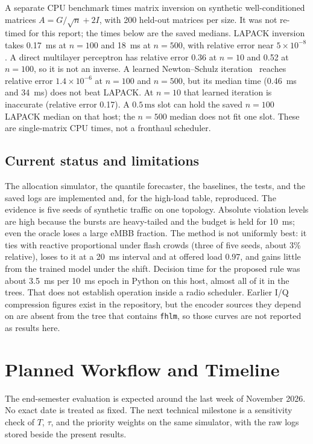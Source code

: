 \documentclass[11pt,a4paper]{article}
\begin{document}
A separate CPU benchmark times matrix inversion on synthetic well-conditioned matrices \(A=G/\sqrt{n}+2I\), with 200 held-out matrices per size. It was not re-timed for this report; the times below are the saved medians. LAPACK inversion takes 0.17~ms at \(n=100\) and 18~ms at \(n=500\), with relative error near \(5\times 10^{-8}\). A direct multilayer perceptron has relative error 0.36 at \(n=10\) and 0.52 at \(n=100\), so it is not an inverse. A learned Newton--Schulz iteration~\cite{schulz1933} reaches relative error \(1.4\times 10^{-6}\) at \(n=100\) and \(n=500\), but its median time (0.46~ms and 34~ms) does not beat LAPACK. At \(n=10\) that learned iteration is inaccurate (relative error 0.17). A \(0.5\,\mathrm{ms}\) slot can hold the saved \(n=100\) LAPACK median on that host; the \(n=500\) median does not fit one slot. These are single-matrix CPU times, not a fronthaul scheduler.

\subsection{Current status and limitations}

The allocation simulator, the quantile forecaster, the baselines, the tests, and the saved logs are implemented and, for the high-load table, reproduced. The evidence is five seeds of synthetic traffic on one topology. Absolute violation levels are high because the bursts are heavy-tailed and the budget is held for 10~ms; even the oracle loses a large eMBB fraction. The method is not uniformly best: it ties with reactive proportional under flash crowds (three of five seeds, about 3\% relative), loses to it at a 20~ms interval and at offered load 0.97, and gains little from the trained model under the shift. Decision time for the proposed rule was about 3.5~ms per 10~ms epoch in Python on this host, almost all of it in the trees. That does not establish operation inside a radio scheduler. Earlier I/Q compression figures exist in the repository, but the encoder sources they depend on are absent from the tree that contains \texttt{fhlm}, so those curves are not reported as results here.

\section{Planned Workflow and Timeline}

The end-semester evaluation is expected around the last week of November 2026. No exact date is treated as fixed. The next technical milestone is a sensitivity check of \(T\), \(\tau\), and the priority weights on the same simulator, with the raw logs stored beside the present results.
\end{document}
